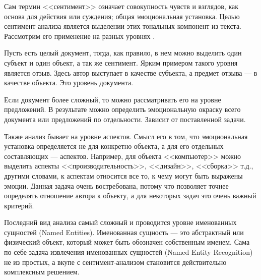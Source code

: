 \bigskip\par
Сам термин <<сентимент>> означает совокупность чувств и взглядов, как основа для действия или суждения; общая
эмоциональная установка. Целью сентимент-анализа является выделении этих тональных компонент из текста.
Рассмотрим его применение на разных уровнях \cite{Semina}.

\bigskip\par
Пусть есть целый документ, тогда, как правило, в нем можно выделить один субъект и один объект, а так же
сентимент. Ярким примером такого уровня является отзыв. Здесь автор выступает в качестве субъекта, а предмет
отзыва --- в качестве объекта. Это уровень документа.

\bigskip\par
Если документ более сложный, то можно рассматривать его на уровне предложений. В результате можно определить
эмоциональную окраску всего документа или предложений по отдельности. Зависит от поставленной задачи.

\bigskip\par
Также анализ бывает на уровне аспектов. Смысл его в том, что эмоциональная установка определяется не для
конкретно объекта, а для его отдельных составляющих --- аспектов. Например, для объекта <<компьютер>> можно
выделить аспекты <<производительность>>, <<дизайн>>, <<сборка>> т.д., другими словами, к аспектам относится
все то, к чему могут быть выражены эмоции. Данная задача очень востребована, потому что позволяет точнее
определять отношение автора к объекту, а для некоторых задач это очень важный критерий.

\bigskip\par
Последний вид анализа самый сложный и проводится уровне именованных сущностей (Named Entities). Именованная
сущность --- это абстрактный или физический объект, который может быть обозначен собственным именем. Сама по
себе задача извлечения именованных сущностей (Named Entity Recognition) не из простых, а вкупе с
сентимент-анализом становится действительно комплексным решением.


